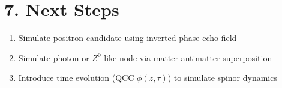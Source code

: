 \documentclass[12pt]{article}
\begin{document}
\section*{7. Next Steps}
\begin{enumerate}
  \item Simulate positron candidate using inverted-phase echo field
  \item Simulate photon or $Z^0$-like node via matter-antimatter superposition
  \item Introduce time evolution (QCC $\phi(z, \tau)$) to simulate spinor dynamics
\end{enumerate}
\end{document}
